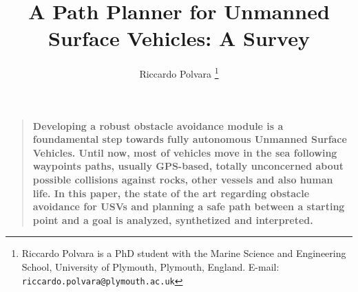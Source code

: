 \documentclass[12pt]{article}
\newenvironment{sciabstract}{%
\begin{quote} \bf}
{\end{quote}}
\begin{document}
\baselineskip24pt

\title{A Path Planner for Unmanned Surface Vehicles: A Survey}
%
%
%

\author{Riccardo Polvara%
\thanks{Riccardo Polvara is a PhD student with the Marine Science and Engineering School, University of Plymouth, Plymouth, England.
      E-mail: {\tt riccardo.polvara@plymouth.ac.uk}}}

\date{}


\maketitle



\begin{sciabstract}
Developing a robust obstacle avoidance module is a foundamental step towards fully autonomous Unmanned Surface Vehicles. Until now, most of vehicles move in the sea following way\-points paths, usually GPS-based, totally unconcerned about possible collisions against rocks, other vessels and also human life. In this paper, the state of the art regarding obstacle avoidance for USVs and planning a safe path between a starting point and a goal is analyzed, synthetized and interpreted.
\end{sciabstract}

\end{document}
